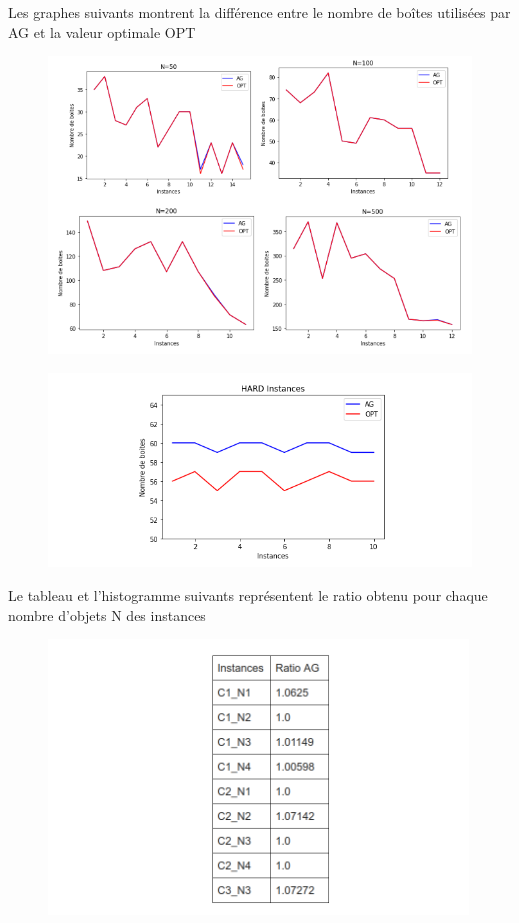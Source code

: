\documentclass{article}
\begin{document}
Les graphes suivants montrent la différence entre le nombre de boîtes utilisées par AG et  la valeur optimale OPT
\begin{figure}[H]
  \includegraphics[width=\linewidth]{../figures/pic08.PNG}
\end{figure}
\begin{figure}[H]
  \includegraphics[width=\linewidth]{../figures/pic09.PNG}
\end{figure}
Le tableau et l'histogramme suivants représentent le ratio obtenu pour chaque nombre d'objets N des instances
\begin{figure}[H]
  \includegraphics[width=\linewidth]{../figures/pic10.PNG}
\end{figure}
\end{document}
